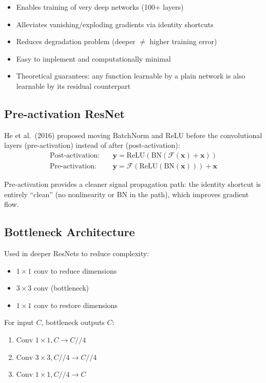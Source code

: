 \begin{properties}
\begin{itemize}
    \item Enables training of very deep networks (100+ layers)
    \item Alleviates vanishing/exploding gradients via identity shortcuts
    \item Reduces degradation problem (deeper $\neq$ higher training error)
    \item Easy to implement and computationally minimal
    \item Theoretical guarantees: any function learnable by a plain network is also learnable by its residual counterpart
\end{itemize}
\end{properties}

\subsection{Pre-activation ResNet}

He et al.\ (2016) proposed moving BatchNorm and ReLU before the convolutional layers (pre-activation) instead of after (post-activation):
\begin{align}
\text{Post-activation:} \quad &\mathbf{y} = \text{ReLU}(\text{BN}(\mathcal{F}(\mathbf{x}) + \mathbf{x})) \\
\text{Pre-activation:} \quad &\mathbf{y} = \mathcal{F}(\text{ReLU}(\text{BN}(\mathbf{x}))) + \mathbf{x}
\end{align}

Pre-activation provides a cleaner signal propagation path: the identity shortcut is entirely ``clean'' (no nonlinearity or BN in the path), which improves gradient flow.

\subsection{Bottleneck Architecture}

Used in deeper ResNets to reduce complexity:
\begin{itemize}
    \item $1\times1$ conv to reduce dimensions
    \item $3\times3$ conv (bottleneck)
    \item $1\times1$ conv to restore dimensions
\end{itemize}

For input $C$, bottleneck outputs $C$:
\begin{enumerate}
    \item $\text{Conv }1\times1, C \rightarrow C//4$
    \item $\text{Conv }3\times3, C//4 \rightarrow C//4$
    \item $\text{Conv }1\times1, C//4 \rightarrow C$
\end{enumerate}

